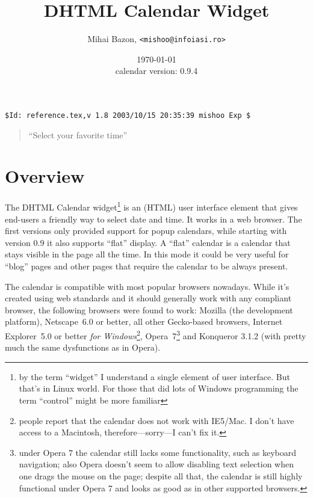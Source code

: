 \documentclass[a4paper,10pt]{article}
\title{DHTML Calendar Widget}
\author{Mihai Bazon, \texttt{<mishoo@infoiasi.ro>}}
\date{\today\\\vspace{0.2ex}
{\small
calendar version: 0.9.4
}
}
\begin{document}
\maketitle
{\small\verb|$Id: reference.tex,v 1.8 2003/10/15 20:35:39 mishoo Exp $|}

{\begin{small}\begin{quote}
{\begin{flushright}
\noindent
``Select your favorite time''
\end{flushright}}
\end{quote}\end{small}}
\tableofcontents


\section{Overview}

The DHTML Calendar widget\footnote
        {
        by the term ``widget'' I understand a single element of user interface.
        But that's in Linux world.  For those that did lots of Windows
        programming the term ``control'' might be more familiar
        }
is an (HTML) user interface element that gives end-users a friendly way to
select date and time.  It works in a web browser.  The first versions only provided
support for popup calendars, while starting with version 0.9 it also supports
``flat'' display.  A ``flat'' calendar is a calendar that stays visible in the
page all the time.  In this mode it could be very useful for ``blog'' pages and
other pages that require the calendar to be always present.

The calendar is compatible with most popular browsers nowadays.  While it's
created using web standards and it should generally work with any compliant
browser, the following browsers were found to work: Mozilla (the
development platform), Netscape~6.0 or better, all other Gecko-based browsers,
Internet Explorer~5.0 or better \emph{for Windows}\footnote{people report that the calendar does
not work with IE5/Mac.  I don't have access to a Macintosh,
therefore---sorry---I can't fix it.}, Opera~7\footnote
        { under Opera 7 the calendar still lacks some functionality, such as
        keyboard navigation; also Opera doesn't seem to allow disabling text
        selection when one drags the mouse on the page; despite all that, the
        calendar is still highly functional under Opera 7 and looks as good as
        in other supported browsers. } and Konqueror 3.1.2 (with pretty much the
same dysfunctions as in Opera).
\end{document}
